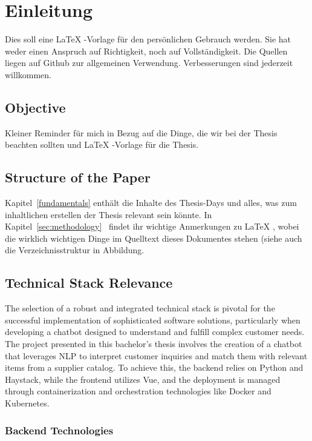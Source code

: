 \section{Einleitung}
Dies soll eine \LaTeX{}
-Vorlage für den persönlichen Gebrauch werden.
Sie hat weder einen Anspruch auf Richtigkeit, noch auf Vollständigkeit.
Die Quellen liegen auf Github zur allgemeinen Verwendung.
Verbesserungen sind jederzeit willkommen.

\subsection{Objective}
Kleiner Reminder für mich in Bezug auf die Dinge, die wir bei der Thesis beachten sollten und \LaTeX{}
-Vorlage für die Thesis.

\subsection{Structure of the Paper}
Kapitel~\ref{fundamentals}
enthält die Inhalte des Thesis-Days und alles, was zum inhaltlichen erstellen der Thesis relevant sein könnte.
In
Kapitel~\ref{sec:methodology}~ findet ihr wichtige Anmerkungen zu \LaTeX{}
, wobei die wirklich wichtigen Dinge im Quelltext dieses Dokumentes stehen (siehe auch die Verzeichnisstruktur in
Abbildung.

\subsection{Technical Stack Relevance}

The selection of a robust and integrated technical stack is pivotal for the successful implementation of sophisticated
software solutions, particularly when developing a chatbot designed to understand and fulfill complex customer needs.
The project presented in this bachelor’s thesis involves the creation of a chatbot that leverages \ac{NLP} to interpret
customer inquiries and match them with relevant items from a supplier catalog. To achieve this, the backend relies on
Python and Haystack, while the frontend utilizes Vue, and the deployment is managed through containerization and
orchestration technologies like Docker and Kubernetes.

\subsubsection{Backend Technologies}



